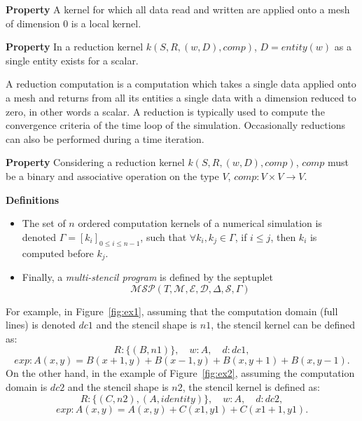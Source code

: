 \noindent \textbf{Property}
A kernel for which all data read and written are applied onto a mesh of dimension $0$ is a local kernel.

\noindent \textbf{Property}
In a reduction kernel $k(S,R,(w,D),comp)$, $D=entity(w)$ as a single entity exists for a scalar.

\medskip
A reduction computation is a computation which takes a single data applied onto a mesh and returns from all its entities a single data with a dimension reduced to zero, in other words a scalar. A reduction is typically used to compute the convergence criteria of the time loop of the simulation. Occasionally reductions can also be performed during a time iteration. %

\noindent \textbf{Property}
Considering a reduction kernel $k(S,R,(w,D),comp)$, $comp$ must be a binary and associative operation on the type $V$, $comp: V \times V \rightarrow V$.

\noindent \textbf{Definitions}
\begin{itemize}
\item The set of $n$ ordered computation kernels of a numerical simulation is denoted $\Gamma = [k_i]_{0 \leq i \leq n-1}$, such that $\forall k_i,k_j \in \Gamma$, if $i \leq j$, then $k_i$ is computed before $k_j$.
\item Finally, a \textit{multi-stencil program} is defined by the septuplet 
\begin{equation*}
\mathcal{MSP}(T,\mathcal{M},\mathcal{E},\mathcal{D},\Delta, \mathcal{S},\Gamma)
\end{equation*}
\end{itemize}

For example, in Figure~\ref{fig:ex1}, assuming that the computation domain (full lines) is denoted $dc1$ and the stencil shape is $n1$, the stencil kernel can be defined as:
\begin{equation*}
R: \{(B,n1)\}, \quad w: A, \quad d: dc1,
\end{equation*}
\begin{equation*}
exp: A(x,y)=B(x+1,y)+B(x-1,y)+B(x,y+1)+B(x,y-1).
\end{equation*}
On the other hand, in the example of Figure~\ref{fig:ex2}, assuming the computation domain is $dc2$ and the stencil shape is $n2$, the stencil kernel is defined as:
\begin{equation*}
R: \{(C,n2),(A,identity)\}, \quad w: A, \quad d: dc2,
\end{equation*}
\begin{equation*}
exp: A(x,y)=A(x,y)+C(x1,y1)+C(x1+1,y1).
\end{equation*}

